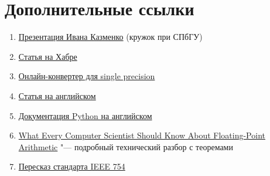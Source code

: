 \section{Дополнительные ссылки}

\begin{frame}
	\begin{enumerate}
		\item \href{http://acm.math.spbu.ru/~gassa/slides/number-representation.ru.pdf}{Презентация Ивана Казменко} (кружок при СПбГУ)
		\item \href{https://habrahabr.ru/post/112953/}{Статья на Хабре}
		\item \href{https://www.h-schmidt.net/FloatConverter/IEEE754.html}{Онлайн-конвертер для single precision}
		\item \href{http://steve.hollasch.net/cgindex/coding/ieeefloat.html}{Статья на английском}
		\item \href{https://docs.python.org/3/tutorial/floatingpoint.html}{Документация Python на английском}
		\item \href{https://docs.oracle.com/cd/E19957-01/806-3568/ncg_goldberg.html}{What Every Computer Scientist Should Know About Floating-Point Arithmetic} "--- подробный технический разбор с теоремами
		\item \href{http://www.softelectro.ru/ieee754.html}{Пересказ стандарта IEEE 754}
	\end{enumerate}
\end{frame}

